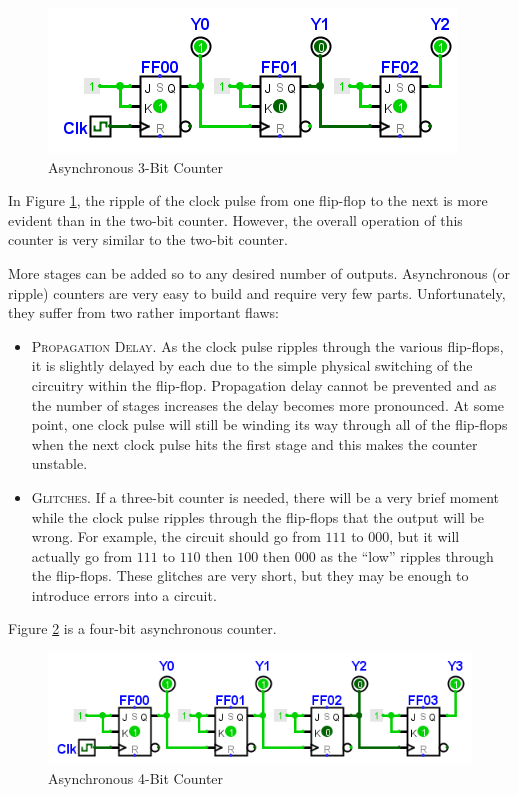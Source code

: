 \begin{figure}[H]
	\centering
	\includegraphics[width=\maxwidth{.95\linewidth}]{gfx/09_11}
	\caption{Asynchronous 3-Bit Counter}
	\label{fig:09_11}
\end{figure}

In Figure \ref{fig:09_11}, the ripple of the clock pulse from one flip-flop to the next is more evident than in the two-bit counter. However, the overall operation of this counter is very similar to the two-bit counter.

More stages can be added so to any desired number of outputs. Asynchronous (or ripple) counters are very easy to build and require very few parts. Unfortunately, they suffer from two rather important flaws:

\begin{itemize}
  \item \textsc{Propagation Delay}. As the clock pulse ripples through the various flip-flops, it is slightly delayed by each due to the simple physical switching of the circuitry within the flip-flop. Propagation delay cannot be prevented and as the number of stages increases the delay becomes more pronounced. At some point, one clock pulse will still be winding its way through all of the flip-flops when the next clock pulse hits the first stage and this makes the counter unstable. 

  \item \textsc{Glitches}. If a three-bit counter is needed, there will be a very brief moment while the clock pulse ripples through the flip-flops that the output will be wrong. For example, the circuit should go from $ 111 $ to $ 000 $, but it will actually go from $ 111 $ to $ 110 $ then $ 100 $ then $ 000 $ as the ``low'' ripples through the flip-flops. These glitches are very short, but they may be enough to introduce errors into a circuit.
\end{itemize}

Figure \ref{fig:09_12} is a four-bit asynchronous counter.

\begin{figure}[H]
	\centering
	\includegraphics[width=\maxwidth{.95\linewidth}]{gfx/09_12}
	\caption{Asynchronous 4-Bit Counter}
	\label{fig:09_12}
\end{figure}

